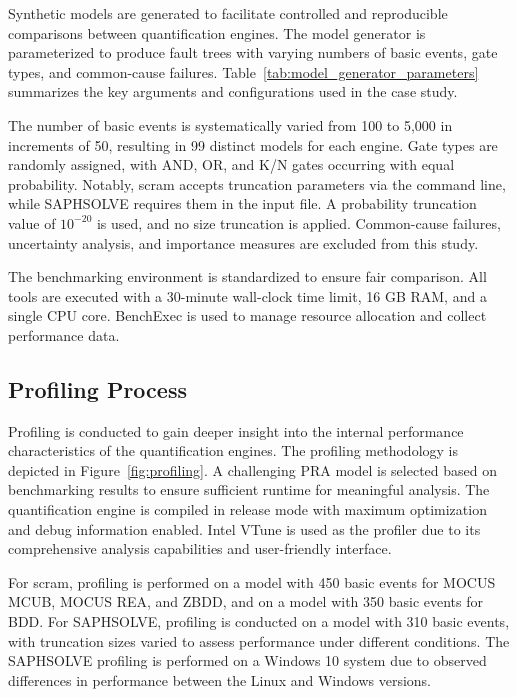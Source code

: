 

Synthetic models are generated to facilitate controlled and reproducible comparisons between quantification engines. The model generator is parameterized to produce fault trees with varying numbers of basic events, gate types, and common-cause failures. Table~\ref{tab:model_generator_parameters} summarizes the key arguments and configurations used in the case study.



The number of basic events is systematically varied from 100 to 5,000 in increments of 50, resulting in 99 distinct models for each engine. Gate types are randomly assigned, with AND, OR, and K/N gates occurring with equal probability. Notably, scram accepts truncation parameters via the command line, while SAPHSOLVE requires them in the input file. A probability truncation value of $10^{-20}$ is used, and no size truncation is applied. Common-cause failures, uncertainty analysis, and importance measures are excluded from this study.

The benchmarking environment is standardized to ensure fair comparison. All tools are executed with a 30-minute wall-clock time limit, 16 GB RAM, and a single CPU core. BenchExec is used to manage resource allocation and collect performance data.

\subsection{Profiling Process}
Profiling is conducted to gain deeper insight into the internal performance characteristics of the quantification engines. The profiling methodology is depicted in Figure~\ref{fig:profiling}. A challenging PRA model is selected based on benchmarking results to ensure sufficient runtime for meaningful analysis. The quantification engine is compiled in release mode with maximum optimization and debug information enabled. Intel VTune is used as the profiler due to its comprehensive analysis capabilities and user-friendly interface.



For scram, profiling is performed on a model with 450 basic events for MOCUS MCUB, MOCUS REA, and ZBDD, and on a model with 350 basic events for BDD. For SAPHSOLVE, profiling is conducted on a model with 310 basic events, with truncation sizes varied to assess performance under different conditions. The SAPHSOLVE profiling is performed on a Windows 10 system due to observed differences in performance between the Linux and Windows versions.

